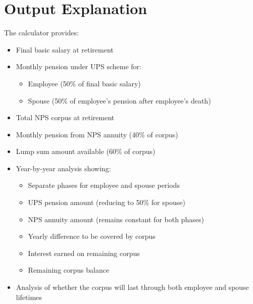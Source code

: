 \documentclass{article}
\begin{document}
\section{Output Explanation}
The calculator provides:
\begin{itemize}
    \item Final basic salary at retirement
    \item Monthly pension under UPS scheme for:
    \begin{itemize}
        \item Employee (50\% of final basic salary)
        \item Spouse (50\% of employee's pension after employee's death)
    \end{itemize}
    \item Total NPS corpus at retirement
    \item Monthly pension from NPS annuity (40\% of corpus)
    \item Lump sum amount available (60\% of corpus)
    \item Year-by-year analysis showing:
    \begin{itemize}
        \item Separate phases for employee and spouse periods
        \item UPS pension amount (reducing to 50\% for spouse)
        \item NPS annuity amount (remains constant for both phases)
        \item Yearly difference to be covered by corpus
        \item Interest earned on remaining corpus
        \item Remaining corpus balance
    \end{itemize}
    \item Analysis of whether the corpus will last through both employee and spouse lifetimes
\end{itemize}
\end{document}
